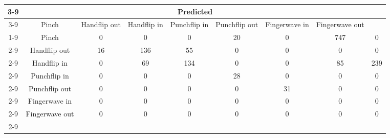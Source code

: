 \documentclass{standalone}
\begin{document}
 
 \begin{tabular}{|c |c |c |c |c |c |c |c |c |}
\cline{3-9}\multicolumn{2}{c|}{} & \multicolumn{7}{c|}{Predicted} \\ 
\cline{3-9} \multicolumn{2}{c |}{ } & Pinch & Handflip out & Handflip in & Punchflip in & Punchflip out & Fingerwave in & Fingerwave out\\ 
\cline{1-9}\multirow{7}{*}{\rotatebox[origin=c]{90}{Actual}} & Pinch & 0 & 0 & 0 & 20 & 0 & 747 & 0\\ 
 \cline{2-9} & Handflip out & 16 & 136 & 55 & 0 & 0 & 0 & 0\\ 
 \cline{2-9} & Handflip in & 0 & 69 & 134 & 0 & 0 & 85 & 239\\ 
 \cline{2-9} & Punchflip in & 0 & 0 & 0 & 28 & 0 & 0 & 0\\ 
 \cline{2-9} & Punchflip out & 0 & 0 & 0 & 0 & 31 & 0 & 0\\ 
 \cline{2-9} & Fingerwave in & 0 & 0 & 0 & 0 & 0 & 0 & 0\\ 
 \cline{2-9} & Fingerwave out & 0 & 0 & 0 & 0 & 0 & 0 & 0\\ 
 \cline{2-9}\hline \end{tabular}
 
\end{document}
